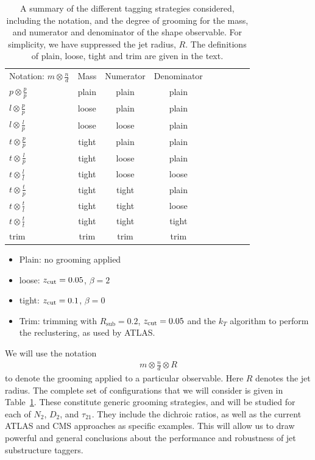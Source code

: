 \documentclass[11pt,letterpaper]{article}
\DeclareRobustCommand{\Tab}[1]{Table~\ref{#1}}
\newcommand{\zcut}{z_{\rm cut}}
\begin{document}
\begin{table}[t!]
\begin{center}
\begin{tabular}{| l | c | c |c |c|c|c |c|r| }
  \hline                       
  Notation: $m \otimes \frac{n}{d}$ & Mass & Numerator & Denominator \\
  $p \otimes \frac{p}{p}$ & plain  &  plain & plain \\
  $l \otimes \frac{p}{p}$ & loose  &  plain & plain \\
  $l \otimes \frac{l}{p}$ & loose  &  loose & plain \\
  $t \otimes \frac{p}{p}$ & tight  &  plain & plain \\
  $t \otimes \frac{l}{p}$ & tight  &  loose & plain \\
  $t \otimes \frac{l}{l}$ & tight  &  loose & loose \\
  $t \otimes \frac{t}{p}$ & tight  &  tight & plain \\
  $t \otimes \frac{t}{l}$ & tight  &  tight & loose \\
  $t \otimes \frac{t}{t}$ & tight  &  tight & tight \\
  $\text{trim}$ & trim &  trim & trim \\
  \hline  
\end{tabular}
\end{center}
\caption{
A summary of the different tagging strategies considered, including the notation, and the degree of grooming for the mass, and numerator and denominator of the shape observable. For simplicity, we have suppressed the jet radius, $R$. The definitions of plain, loose, tight and trim are given in the text.
}
\label{tab:tag_summary}
\end{table}


\begin{itemize}
\item Plain: no grooming applied
\item loose: $\zcut=0.05$, $\beta=2$
\item tight: $\zcut=0.1$, $\beta=0$
\item Trim: trimming with $R_{\text{sub}}=0.2$,  $ \zcut=0.05$ and the $k_T$ algorithm to perform the reclustering, as used by ATLAS.
\end{itemize}
We will use the notation 
\begin{align}
m \otimes \frac{n}{d} \otimes R
\end{align}
to denote the grooming applied to a particular observable. Here $R$ denotes the jet radius. The complete set of configurations that we will consider is given in \Tab{tab:tag_summary}. These constitute generic grooming strategies, and will be studied for each of $N_2$, $D_2$, and $\tau_{21}$. They include the dichroic ratios, as well as the current ATLAS and CMS approaches as specific examples.  This will allow us to draw powerful and general conclusions about the performance and robustness of jet substructure taggers.
\end{document}
